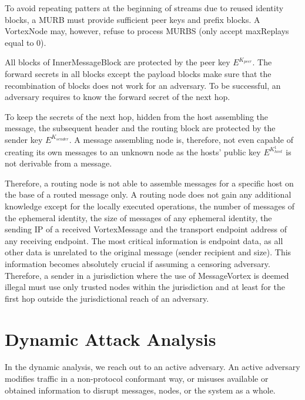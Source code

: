 To avoid repeating patters at the beginning of streams due to reused identity blocks, a MURB must provide sufficient peer keys and prefix blocks. A VortexNode may, however, refuse to process MURBS (only accept maxReplays equal to 0).

All blocks of InnerMessageBlock are protected by the peer key $E^{K_{peer}}$. The forward secrets in all blocks except the payload blocks make sure that the recombination of blocks does not work for an adversary. To be successful, an adversary requires to know the forward secret of the next hop.

To keep the secrets of the next hop, hidden from the host assembling the message, the subsequent header and the routing block are protected by the sender key $E^{K_{sender}}$. A message assembling node is, therefore, not even capable of creating its own messages to an unknown node as the hosts' public key $E^{K^{1}_{host}}$ is not derivable from a message.

Therefore, a routing node is not able to assemble messages for a specific host on the base of a routed message only. A routing node does not gain any additional knowledge except for the locally executed operations, the number of messages of the ephemeral identity, the size of messages of any ephemeral identity, the sending IP of a received VortexMessage and the transport endpoint address of any receiving endpoint. The most critical information is endpoint data, as all other data is unrelated to the original message (sender recipient and size). This information becomes absolutely crucial if assuming a censoring adversary. Therefore, a sender in a jurisdiction where the use of MessageVortex is deemed illegal must use only trusted nodes within the jurisdiction and at least for the first hop outside the jurisdictional reach of an adversary.

\chapter{Dynamic Attack Analysis}
In the dynamic analysis, we reach out to an active adversary. An active adversary modifies traffic in a non-protocol conformant way, or misuses available or obtained information to disrupt messages, nodes, or the system as a whole.

